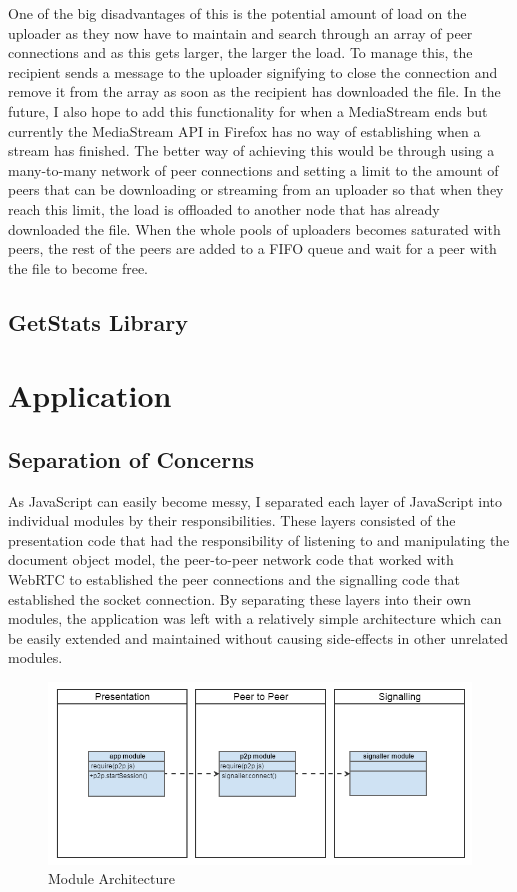 \documentclass[]{report}
\begin{document}
			One of the big disadvantages of this is the potential amount of load on the uploader as they now have to maintain and search through an array of peer connections and as this gets larger, the larger the load. To manage this, the recipient sends a message to the uploader signifying to close the connection and remove it from the array as soon as the recipient has downloaded the file. In the future, I also hope to add this functionality for when a MediaStream ends but currently the MediaStream API in Firefox has no way of establishing when a stream has finished. The better way of achieving this would be through using a many-to-many network of peer connections and setting a limit to the amount of peers that can be downloading or streaming from an uploader so that when they reach this limit, the load is offloaded to another node that has already downloaded the file. When the whole pools of uploaders becomes saturated with peers, the rest of the peers are added to a FIFO queue and wait for a peer with the file to become free.
			
			\subsection{GetStats Library}
			
		\section{Application}
			\subsection{Separation of Concerns}
			As JavaScript can easily become messy, I separated each layer of JavaScript into individual modules by their responsibilities. These layers consisted of the presentation code that had the responsibility of listening to and manipulating the document object model, the peer-to-peer network code that worked with WebRTC to established the peer connections and the signalling code that established the socket connection. By separating these layers into their own modules, the application was left with a relatively simple architecture which can be easily extended and maintained without causing side-effects in other unrelated modules.
			
			\begin{figure}[H]
				\caption{Module Architecture}
				\centering
				\includegraphics[scale=0.5]{file-architecture.png}
			\end{figure}
			
\end{document}
